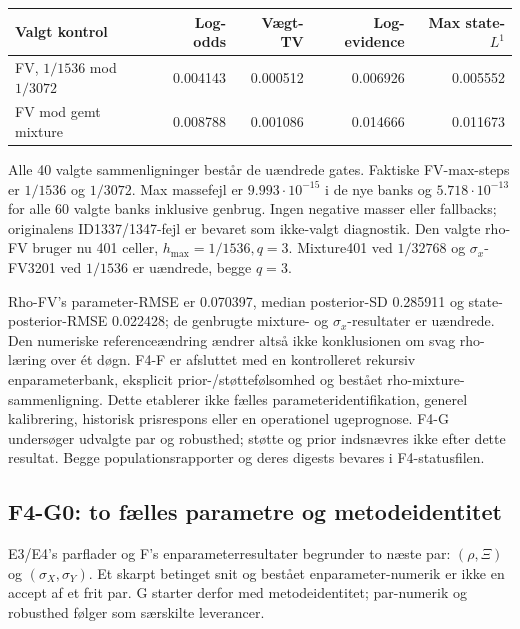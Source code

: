 \begin{center}
\begin{tabular}{@{}lrrrr@{}}
\toprule
Valgt kontrol & Log-odds & Vægt-TV & Log-evidence & Max state-\(L^1\)\\
\midrule
FV, \(1/1536\) mod \(1/3072\) & 0.004143 & 0.000512 & 0.006926 & 0.005552\\
FV mod gemt mixture & 0.008788 & 0.001086 & 0.014666 & 0.011673\\
\bottomrule
\end{tabular}
\end{center}
Alle 40 valgte sammenligninger består de uændrede gates.
Faktiske FV-max-steps er \(1/1536\) og \(1/3072\). Max massefejl er
\(9.993\cdot10^{-15}\) i de nye banks og \(5.718\cdot10^{-13}\)
for alle 60 valgte banks inklusive genbrug. Ingen negative masser eller
fallbacks; originalens ID1337/1347-fejl er bevaret som ikke-valgt diagnostik.
Den valgte rho-FV bruger nu 401 celler, \(h_{\max}=1/1536,q=3\).
Mixture401 ved \(1/32768\) og \(\sigma_x\)-FV3201 ved \(1/1536\)
er uændrede, begge \(q=3\).

Rho-FV's parameter-RMSE er 0.070397, median posterior-SD 0.285911
og state-posterior-RMSE 0.022428; de genbrugte mixture- og
\(\sigma_x\)-resultater er uændrede. Den numeriske referenceændring
ændrer altså ikke konklusionen om svag rho-læring over ét døgn.
F4-F er afsluttet med en kontrolleret rekursiv enparameterbank, eksplicit
prior-/støttefølsomhed og bestået rho-mixture-sammenligning.
Dette etablerer ikke fælles parameteridentifikation, generel kalibrering,
historisk prisrespons eller en operationel ugeprognose. F4-G undersøger
udvalgte par og robusthed; støtte og prior indsnævres ikke efter dette resultat.
Begge populationsrapporter og deres digests bevares i F4-statusfilen.

\subsection{F4-G0: to fælles parametre og metodeidentitet}
E3/E4's parflader og F's enparameterresultater begrunder to næste par:
\((\rho,\Xi)\) og \((\sigma_X,\sigma_Y)\). Et skarpt betinget snit og bestået
enparameter-numerik er ikke en accept af et frit par. G starter derfor med
metodeidentitet; par-numerik og robusthed følger som særskilte leverancer.

